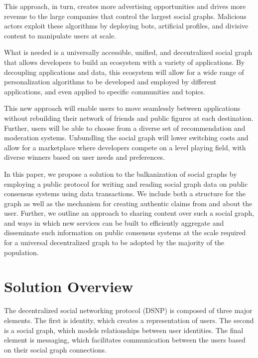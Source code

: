 \documentclass[12pt,letterpaper]{article}
\begin{document}
This approach, in turn, creates more advertising opportunities and drives more revenue to
the large companies that control the largest social graphs. Malicious actors exploit these
algorithms by deploying bots, artificial profiles, and divisive content to manipulate users
at scale.


What is needed is a universally accessible, unified, and decentralized social graph that
allows developers to build an ecosystem with a variety of applications. By decoupling
applications and data, this ecosystem will allow for a wide range of personalization
algorithms to be developed and employed by different applications, and even applied to
specific communities and topics.

This new approach will enable users to move seamlessly between applications without
rebuilding their network of friends and public figures at each destination. Further, users
will be able to choose from a diverse set of recommendation and moderation systems.
Unbundling the social graph will lower switching costs and allow for a marketplace where
developers compete on a level playing field, with diverse winners based on user needs and
preferences.


In this paper, we propose a solution to the balkanization of social graphs by employing a
public protocol for writing and reading social graph data on public consensus systems using
data transactions. We include both a structure for the graph as well as the mechanism for
creating authentic claims from and about the user. Further, we outline an approach to
sharing content over such a social graph, and ways in which new services can be built to
efficiently aggregate and disseminate such information on public consensus systems at the
scale required for a universal decentralized graph to be adopted by the majority of the
population.

\section{Solution Overview}\label{sec:solution_overview}

The decentralized social networking protocol (DSNP) is composed of three major elements.
The first is identity, which creates a representation of users. The second is a social
graph, which models relationships between user identities. The final element is messaging,
which facilitates communication between the users based on their social graph connections.
\end{document}
